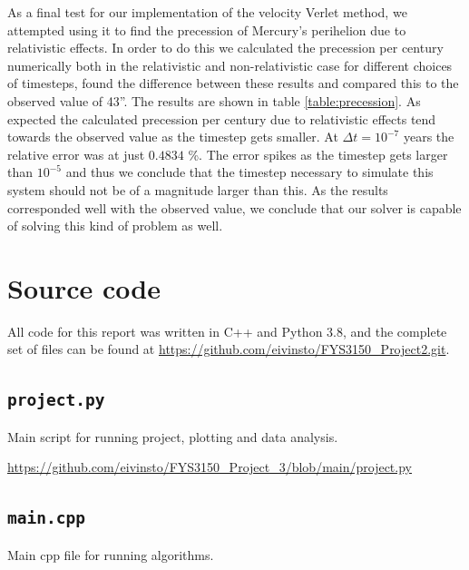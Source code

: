 \documentclass[reprint,english,notitlepage]{revtex4-1}  %
\begin{document}
As a final test for our implementation of the velocity Verlet method, we attempted using it to find the precession of Mercury's perihelion due to relativistic effects. In order to do this we calculated the precession per century numerically both in the relativistic and non-relativistic case for different choices of timesteps, found the difference between these results and compared this to the observed value of 43''. The results are shown in table \ref{table:precession}. As expected the calculated precession per century due to relativistic effects tend towards the observed value as the timestep gets smaller. At $\Delta t = 10^{-7}$ years the relative error was at just $0.4834$ \%. The error spikes as the timestep gets larger than $10^{-5}$ and thus we conclude that the timestep necessary to simulate this system should not be of a magnitude larger than this. As the results corresponded well with the observed value, we conclude that our solver is capable of solving this kind of problem as well.


\onecolumngrid
{}
\newpage
\twocolumngrid

\appendix
\section{Source code} \label{A}
All code for this report was written in C++ and Python 3.8, and the complete set of files can be found at
\url{https://github.com/eivinsto/FYS3150_Project2.git}.

\cprotect\subsection{\verb+project.py+} \label{A.1}
Main script for running project, plotting and data analysis.

\url{https://github.com/eivinsto/FYS3150_Project_3/blob/main/project.py}

\cprotect\subsection{\verb+main.cpp+} \label{A.2}
Main cpp file for running algorithms.
\end{document}
